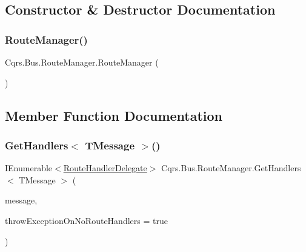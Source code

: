 \subsection{Constructor \& Destructor Documentation}
\mbox{\label{classCqrs_1_1Bus_1_1RouteManager_abcc8a62319ac7a6edd38ed2d26ef5234_abcc8a62319ac7a6edd38ed2d26ef5234}} 
\subsubsection{\texorpdfstring{Route\+Manager()}{RouteManager()}}
{\footnotesize\ttfamily Cqrs.\+Bus.\+Route\+Manager.\+Route\+Manager (\begin{DoxyParamCaption}{ }\end{DoxyParamCaption})}



\subsection{Member Function Documentation}
\mbox{\label{classCqrs_1_1Bus_1_1RouteManager_a738be20bb4ad702f7689e2aad70a9dc5_a738be20bb4ad702f7689e2aad70a9dc5}} 
\subsubsection{\texorpdfstring{Get\+Handlers$<$ T\+Message $>$()}{GetHandlers< TMessage >()}}
{\footnotesize\ttfamily I\+Enumerable$<$\hyperlink{classCqrs_1_1Bus_1_1RouteHandlerDelegate}{Route\+Handler\+Delegate}$>$ Cqrs.\+Bus.\+Route\+Manager.\+Get\+Handlers$<$ T\+Message $>$ (\begin{DoxyParamCaption}\item[{T\+Message}]{message,  }\item[{bool}]{throw\+Exception\+On\+No\+Route\+Handlers = {\ttfamily true} }\end{DoxyParamCaption})}

